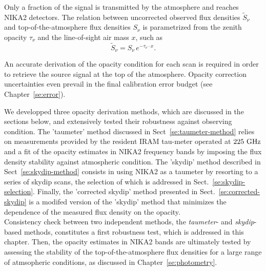%
%


Only a fraction of the signal is transmitted by the atmosphere and
reaches NIKA2 detectors. 
The relation between uncorrected observed flux densities
$\tilde{S}_{\nu}$ and top-of-the-atmosphere flux densities $S_{\nu}$
is parametrized from the zenith opacity $\tau_{\nu}$
and the line-of-sight air mass $x$, such as
\begin{equation}
\tilde{S}_{\nu} = S_{\nu} \, e^{-\tau_{\nu} \cdot x}.
\label{eq:uncorr_flux}
\end{equation}

An accurate derivation of the opacity condition for each scan is
required in order to retrieve the source signal at the top of the
atmosphere. Opacity correction uncertainties even prevail in the
final calibration error budget (see Chapter~\ref{se:error}).

We developped three opacity derivation methods, which are discussed
in the sections below, and extensively tested their robustness against
observing condition. The 'taumeter' method discussed in
Sect~\ref{se:taumeter-method} relies on measurements provided by the
resident IRAM tau-meter operated at $225~\rm{GHz}$ and a fit of the
opacity estimates in NIKA2 frequency bands by imposing the flux
density stability against atmospheric condition. The 'skydip' method
described in Sect~\ref{se:skydip-method} consists in using NIKA2 as a
taumeter by resorting to a series of skydip scans, the selection of
which is addressed in Sect.~\ref{se:skydip-selection}. Finally, the
'corrected skydip' method presented in Sect.~\ref{se:corrected-skydip}
is a modifed version of the 'skydip' method that minimizes the
dependence of the measured flux density on the opacity.\\


Consistency check between two independent methods, the \emph{taumeter}-
and \emph{skydip}-based methods, constitutes a first
robustness test, which is addressed in this chapter.
Then, the opacity estimates in NIKA2 bands are
ultimately tested by assessing the stability of the
top-of-the-atmosphere flux densities for a large range of
atmsopheric conditions, as discussed in Chapter~\ref{se:photometry}.



